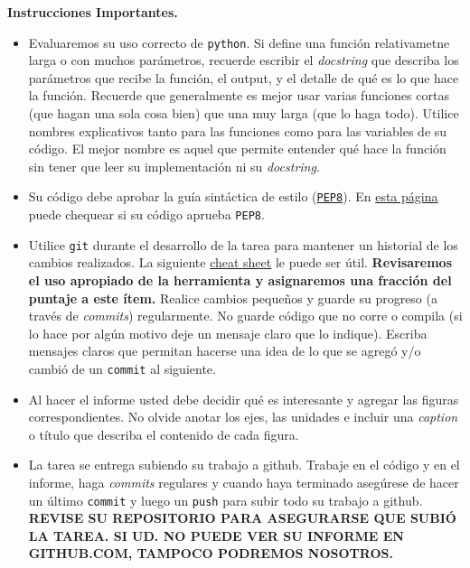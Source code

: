 \documentclass[letter, 11pt]{article}
\begin{document}
\pagebreak
\noindent\textbf{Instrucciones Importantes.}
\begin{itemize}

\item Evaluaremos su uso correcto de \texttt{python}. Si define una función
  relativametne larga o con muchos parámetros, recuerde escribir el
  \emph{docstring} que describa los parámetros que recibe la función, el
  output, y el detalle de qué es lo que hace la función. Recuerde que
  generalmente es mejor usar varias funciones cortas (que hagan una sola cosa
  bien) que una muy larga (que lo haga todo).  Utilice nombres explicativos
  tanto para las funciones como para las variables de su código. El mejor
  nombre es aquel que permite entender qué hace la función sin tener que leer
  su implementación ni su \emph{docstring}.

\item Su código debe aprobar la guía sintáctica de estilo
  (\href{https://www.python.org/dev/peps/pep-0008/}{\texttt{PEP8}}). En
  \href{http://pep8online.com}{esta página} puede chequear si su código aprueba
  \texttt{PEP8}.

\item Utilice \texttt{git} durante el desarrollo de la tarea para mantener un
  historial de los cambios realizados. La siguiente
  \href{https://education.github.com/git-cheat-sheet-education.pdf}{cheat
    sheet} le puede ser útil. {\bf Revisaremos el uso apropiado de la
  herramienta y asignaremos una fracción del puntaje a este ítem.} Realice
  cambios pequeños y guarde su progreso (a través de \emph{commits})
  regularmente. No guarde código que no corre o compila (si lo hace por algún
  motivo deje un mensaje claro que lo indique). Escriba mensajes claros que
  permitan hacerse una idea de lo que se agregó y/o cambió de un
  \texttt{commit} al siguiente.

\item Al hacer el informe usted debe decidir qué es interesante y agregar las
  figuras correspondientes. No olvide anotar los ejes, las unidades e incluir
  una \emph{caption} o título que describa el contenido de cada figura.

\item La tarea se entrega subiendo su trabajo a github. Trabaje en el código y
  en el informe, haga \textit{commits} regulares y cuando haya terminado
  asegúrese de hacer un último \texttt{commit} y luego un \texttt{push} para
  subir todo su trabajo a github. \textbf{REVISE SU REPOSITORIO PARA ASEGURARSE
  QUE SUBIÓ LA TAREA. SI UD. NO PUEDE VER SU INFORME EN GITHUB.COM, TAMPOCO
PODREMOS NOSOTROS.}


\end{itemize}
\end{document}
